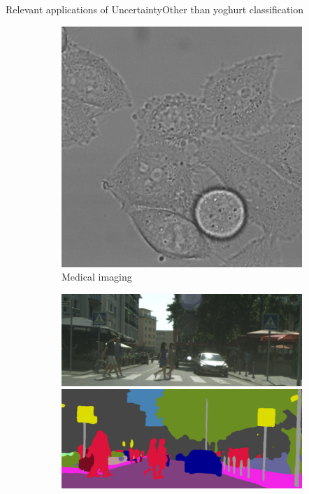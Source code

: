 \documentclass{beamer}
\begin{document}
\begin{frame}{Relevant applications of Uncertainty}{Other than yoghurt classification}
\begin{figure}[H]
	\centering
	\begin{subfigure}{0.28\textwidth}
		\centering
		\includegraphics[width=\textwidth]{medical-imaging}	
		\caption{Medical imaging}
	\end{subfigure}
	\pause
	\begin{subfigure}{0.26\textwidth}	
		\centering
		\includegraphics[width=\textwidth]{autonomous-driving-im}
		\includegraphics[width=\textwidth]{autonomous-driving-sem}\\[.2cm]

\end{subfigure}
\end{figure}
\end{frame}
\end{document}
